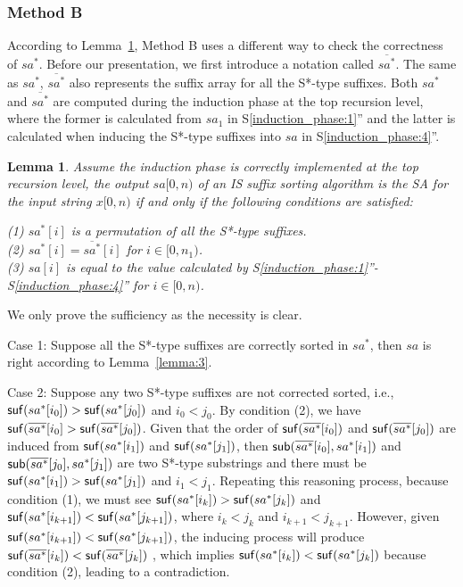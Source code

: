\documentclass[10pt,journal,compsoc]{IEEEtran}
\newtheorem{lemma}[theorem]{Lemma}
\begin{document}
\subsubsection{Method B}\label{sec:proposals:method_b}

According to Lemma~\ref{lemma:4}, Method B uses a different way to check the correctness of $sa^*$. Before our presentation, we first introduce a notation called $\overline{sa^*}$. The same as $sa^*$, $\overline{sa^*}$ also represents the suffix array for all the S*-type suffixes. Both $sa^*$ and $\overline{sa^*}$ are computed during the induction phase at the top recursion level, where the former is calculated from $sa_1$ in S\ref{induction_phase:1}'' and the latter is calculated when inducing the S*-type suffixes into $sa$ in S\ref{induction_phase:4}''. 

\begin{lemma} \label{lemma:4}
    Assume the induction phase is correctly implemented at the top recursion level, the output $sa[0, n)$ of an IS suffix sorting algorithm is the SA for the input string $x[0, n)$ if and only if the following conditions are satisfied:

	(1) $sa^*[i]$ is a permutation of all the S*-type suffixes. \\
	(2) $sa^*[i] = \overline{sa^*}[i]$ for $i \in [0, n_1)$. \\
	(3) $sa[i]$ is equal to the value calculated by S\ref{induction_phase:1}''-S\ref{induction_phase:4}'' for $i \in [0, n)$. \\

\end{lemma}

\begin{IEEEproof}

    We only prove the sufficiency as the necessity is clear.

    Case 1: Suppose all the S*-type suffixes are correctly sorted in $sa^*$, then $sa$ is right according to Lemma~\ref{lemma:3}.

    Case 2: Suppose any two S*-type suffixes are not corrected sorted, i.e., ${\sf suf}(sa^*[i_0]) > {\sf suf}(sa^*[j_0])$ and $i_0 < j_0$. By condition (2), we have ${\sf suf}(\overline{sa^*}[i_0] > {\sf suf}(\overline{sa^*}[j_0])$. Given that the order of ${\sf suf}(\overline{sa^*}[i_0])$ and ${\sf suf}(\overline{sa^*}[j_0])$ are induced from ${\sf suf}(sa^*[i_1])$ and ${\sf suf}(sa^*[j_1])$, then ${\sf sub}(\overline{sa^*}[i_0], sa^*[i_1])$ and ${\sf sub}(\overline{sa^*}[j_0], sa^*[j_1])$ are two S*-type substrings and there must be ${\sf suf}(sa^*[i_1])>{\sf suf}(sa^*[j_1])$ and $i_1 < j_1$. Repeating this reasoning process, because condition (1), we must see ${\sf suf}(sa^*[i_k])>{\sf suf}(sa^*[j_k])$ and ${\sf suf}(sa^*[i_{k+1}])<{\sf suf}(sa^*[j_{k+1}])$, where $i_k < j_k$ and $i_{k+1} < j_{k+1}$. However, given ${\sf suf}(sa^*[i_{k+1}])<{\sf suf}(sa^*[j_{k+1}])$, the inducing process will produce ${\sf suf}(\overline{sa^*}[i_k])<{\sf suf}(\overline{sa^*}[j_k])$ , which implies ${\sf suf}(sa^*[i_k])<{\sf suf}(sa^*[j_k])$ because condition (2), leading to a contradiction.
	
\end{IEEEproof}
	
\end{document}

